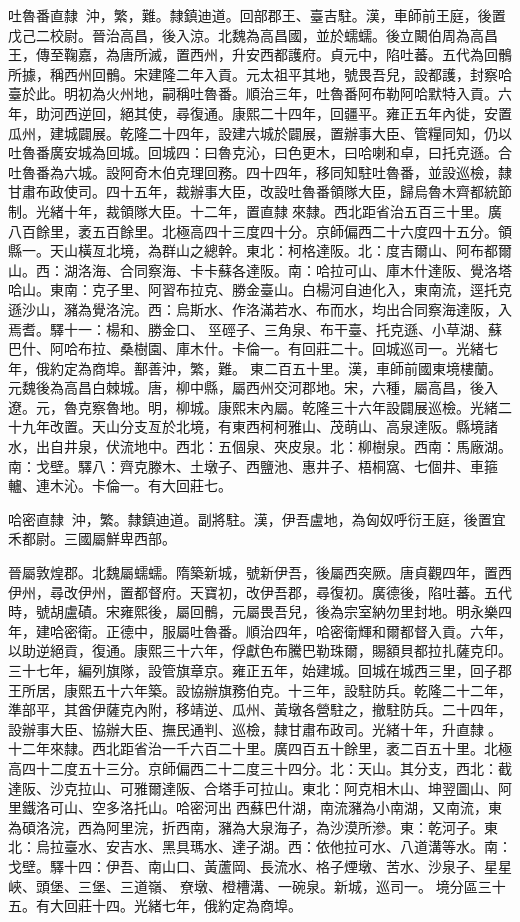\begin{pinyinscope}
吐魯番直隸：沖，繁，難。隸鎮迪道。回部郡王、臺吉駐。漢，車師前王庭，後置戊己二校尉。晉治高昌，後入涼。北魏為高昌國，並於蠕蠕。後立闞伯周為高昌王，傳至鞠嘉，為唐所滅，置西州，升安西都護府。貞元中，陷吐蕃。五代為回鶻所據，稱西州回鶻。宋建隆二年入貢。元太祖平其地，號畏吾兒，設都護，封察哈臺於此。明初為火州地，嗣稱吐魯番。順治三年，吐魯番阿布勒阿哈默特入貢。六年，助河西逆回，絕其使，尋復通。康熙二十四年，回疆平。雍正五年內徙，安置瓜州，建城闢展。乾隆二十四年，設建六城於闢展，置辦事大臣、管糧同知，仍以吐魯番廣安城為回城。回城四：曰魯克沁，曰色更木，曰哈喇和卓，曰托克遜。合吐魯番為六城。設阿奇木伯克理回務。四十四年，移同知駐吐魯番，並設巡檢，隸甘肅布政使司。四十五年，裁辦事大臣，改設吐魯番領隊大臣，歸烏魯木齊都統節制。光緒十年，裁領隊大臣。十二年，置直隸來隸。西北距省治五百三十里。廣八百餘里，袤五百餘里。北極高四十三度四十分。京師偏西二十六度四十五分。領縣一。天山橫亙北境，為群山之總幹。東北：柯格達阪。北：度吉爾山、阿布都爾山。西：湖洛海、合同察海、卡卡蘇各達阪。南：哈拉可山、庫木什達阪、覺洛塔哈山。東南：克子里、阿習布拉克、勝金臺山。白楊河自迪化入，東南流，逕托克遜沙山，瀦為覺洛浣。西：烏斯水、作洛滿若水、布而水，均出合同察海達阪，入焉耆。驛十一：楊和、勝金口、巠硜子、三角泉、布干臺、托克遜、小草湖、蘇巴什、阿哈布拉、桑樹園、庫木什。卡倫一。有回莊二十。回城巡司一。光緒七年，俄約定為商埠。鄯善沖，繁，難。東二百五十里。漢，車師前國東境樓蘭。元魏後為高昌白棘城。唐，柳中縣，屬西州交河郡地。宋，六種，屬高昌，後入遼。元，魯克察魯地。明，柳城。康熙末內屬。乾隆三十六年設闢展巡檢。光緒二十九年改置。天山分支亙於北境，有東西柯柯雅山、茂萌山、高泉達阪。縣境諸水，出自井泉，伏流地中。西北：五個泉、夾皮泉。北：柳樹泉。西南：馬廠湖。南：戈壁。驛八：齊克滕木、土墩子、西鹽池、惠井子、梧桐窩、七個井、車箍轤、連木沁。卡倫一。有大回莊七。

哈密直隸：沖，繁。隸鎮迪道。副將駐。漢，伊吾盧地，為匈奴呼衍王庭，後置宜禾都尉。三國屬鮮卑西部。

晉屬敦煌郡。北魏屬蠕蠕。隋築新城，號新伊吾，後屬西突厥。唐貞觀四年，置西伊州，尋改伊州，置都督府。天寶初，改伊吾郡，尋復初。廣德後，陷吐蕃。五代時，號胡盧磧。宋雍熙後，屬回鶻，元屬畏吾兒，後為宗室納勿里封地。明永樂四年，建哈密衛。正德中，服屬吐魯番。順治四年，哈密衛輝和爾都督入貢。六年，以助逆絕貢，復通。康熙三十六年，俘獻色布騰巴勒珠爾，賜額貝都拉扎薩克印。三十七年，編列旗隊，設管旗章京。雍正五年，始建城。回城在城西三里，回子郡王所居，康熙五十六年築。設協辦旗務伯克。十三年，設駐防兵。乾隆二十二年，準部平，其酋伊薩克內附，移靖逆、瓜州、黃墩各營駐之，撤駐防兵。二十四年，設辦事大臣、協辦大臣、撫民通判、巡檢，隸甘肅布政司。光緒十年，升直隸。十二年來隸。西北距省治一千六百二十里。廣四百五十餘里，袤二百五十里。北極高四十二度五十三分。京師偏西二十二度三十四分。北：天山。其分支，西北：截達阪、沙克拉山、可雅爾達阪、合塔手可拉山。東北：阿克相木山、坤翌圖山、阿里鐵洛可山、空多洛托山。哈密河出西蘇巴什湖，南流瀦為小南湖，又南流，東為碩洛浣，西為阿里浣，折西南，瀦為大泉海子，為沙漠所滲。東：乾河子。東北：烏拉臺水、安吉水、黑具瑪水、達子湖。西：依他拉可水、八道溝等水。南：戈壁。驛十四：伊吾、南山口、黃蘆岡、長流水、格子煙墩、苦水、沙泉子、星星峽、頭堡、三堡、三道嶺、尞墩、橙槽溝、一碗泉。新城，巡司一。境分區三十五。有大回莊十四。光緒七年，俄約定為商埠。


\end{pinyinscope}
